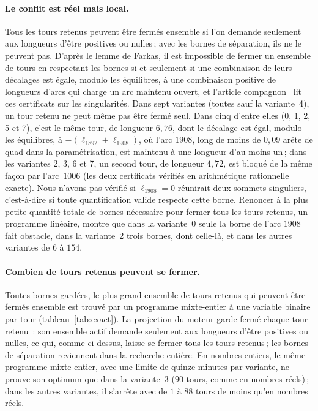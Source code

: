 \documentclass[11pt,a4paper]{article}
\begin{document}
\paragraph{Le conflit est réel mais local.}
Tous les tours retenus peuvent être fermés ensemble si l'on demande
seulement aux longueurs d'être positives ou nulles\,; avec les bornes de
séparation, ils ne le peuvent pas. D'après le lemme de Farkas, il est
impossible de fermer un ensemble de tours en respectant les bornes si et
seulement si une combinaison de leurs décalages est égale, modulo les
équilibres, à une combinaison positive de longueurs d'arcs qui charge un arc
maintenu ouvert, et l'article compagnon~\cite{gardent2026turns} lit ces
certificats sur les singularités. Dans sept variantes (toutes sauf la
variante~4), un tour retenu ne peut même pas être fermé seul. Dans cinq
d'entre elles (0, 1, 2, 5 et 7), c'est le même tour, de longueur $6,76$,
dont le décalage est égal, modulo les équilibres, à $-(\ell_{1892} +
\ell_{1908})$, où l'arc $1908$, long de moins de $0,09$ arête de quad dans
la paramétrisation, est maintenu à une longueur d'au moins un\,; dans les
variantes 2, 3, 6 et 7, un second tour, de longueur $4,72$, est bloqué de
la même façon par l'arc~$1006$ (les deux certificats vérifiés en
arithmétique rationnelle exacte). Nous n'avons pas vérifié si $\ell_{1908}
= 0$ réunirait deux sommets singuliers, c'est-à-dire si toute quantification
valide respecte cette borne. Renoncer à la plus petite quantité totale de
bornes nécessaire pour fermer tous les tours retenus, un programme linéaire,
montre que dans la variante~0 seule la borne de l'arc $1908$ fait obstacle,
dans la variante~2 trois bornes, dont celle-là, et dans les autres variantes
de $6$ à $154$.

\paragraph{Combien de tours retenus peuvent se fermer.}
Toutes bornes gardées, le plus grand ensemble de tours retenus qui peuvent
être fermés ensemble est trouvé par un programme mixte-entier à une variable
binaire par tour (tableau~\ref{tab:exact}). La projection du moteur garde
fermé chaque tour retenu~: son ensemble actif demande seulement aux
longueurs d'être positives ou nulles, ce qui, comme ci-dessus, laisse se
fermer tous les tours retenus\,; les bornes de séparation reviennent dans la
recherche entière. En nombres entiers, le même programme mixte-entier, avec
une limite de quinze minutes par variante, ne prouve son optimum que dans la
variante~3 ($90$ tours, comme en nombres réels)\,; dans les autres
variantes, il s'arrête avec de $1$ à $88$ tours de moins qu'en nombres
réels.
\end{document}
